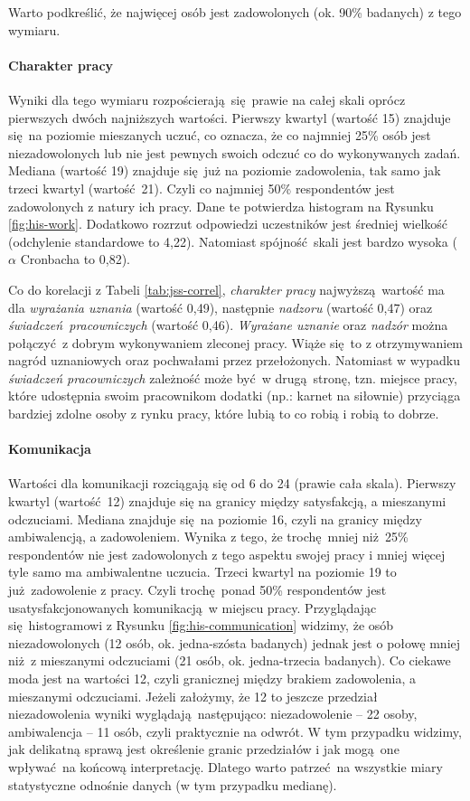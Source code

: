 Warto podkreślić, że najwięcej osób jest zadowolonych (ok. 90\% badanych) z tego wymiaru.

\paragraph{Charakter pracy} Wyniki dla tego wymiaru rozpościerają się prawie na całej skali oprócz pierwszych dwóch najniższych wartości. Pierwszy kwartyl (wartość 15) znajduje się na poziomie mieszanych uczuć, co oznacza, że co najmniej 25\% osób jest niezadowolonych lub nie jest pewnych swoich odczuć co do wykonywanych zadań. Mediana (wartość 19) znajduje się już na poziomie zadowolenia, tak samo jak trzeci kwartyl (wartość 21). Czyli co najmniej 50\% respondentów jest zadowolonych z
natury ich pracy. Dane te potwierdza histogram na Rysunku \ref{fig:his-work}. Dodatkowo rozrzut odpowiedzi uczestników jest średniej wielkość (odchylenie standardowe to 4,22). Natomiast spójność skali jest bardzo wysoka ($\alpha$ Cronbacha to 0,82).

Co do korelacji z Tabeli \ref{tab:jss-correl}, \textit{charakter pracy} najwyższą wartość ma dla \textit{wyrażania uznania} (wartość 0,49), następnie \textit{nadzoru} (wartość 0,47) oraz \textit{świadczeń pracowniczych} (wartość 0,46). \textit{Wyrażane uznanie} oraz \textit{nadzór} można połączyć z dobrym wykonywaniem zleconej pracy. Wiąże się to z otrzymywaniem nagród uznaniowych oraz pochwałami przez przełożonych. Natomiast w wypadku \textit{świadczeń pracowniczych} zależność może być w drugą stronę, tzn. miejsce pracy, które udostępnia swoim
pracownikom dodatki (np.: karnet na siłownie) przyciąga bardziej zdolne osoby z rynku pracy, które lubią to co robią i robią to dobrze.

\paragraph{Komunikacja} Wartości dla komunikacji rozciągają się od 6 do 24 (prawie cała skala). Pierwszy kwartyl (wartość 12) znajduje się na granicy między satysfakcją, a mieszanymi odczuciami. Mediana znajduje się na poziomie 16, czyli na granicy między ambiwalencją, a zadowoleniem. Wynika z tego, że trochę mniej niż 25\% respondentów nie jest zadowolonych z tego aspektu swojej pracy i mniej więcej tyle samo ma ambiwalentne uczucia. Trzeci kwartyl na poziomie 19 to
już zadowolenie z pracy. Czyli trochę ponad 50\% respondentów jest usatysfakcjonowanych komunikacją w miejscu pracy. Przyglądając się histogramowi z Rysunku \ref{fig:his-communication} widzimy, że osób niezadowolonych (12 osób, ok. jedna-szósta badanych) jednak jest o połowę mniej niż z mieszanymi odczuciami (21 osób, ok. jedna-trzecia badanych). Co ciekawe moda jest na wartości 12, czyli granicznej między brakiem zadowolenia, a mieszanymi odczuciami. Jeżeli założymy, że 12 to jeszcze przedział
niezadowolenia wyniki wyglądają następująco: niezadowolenie -- 22 osoby, ambiwalencja -- 11 osób, czyli praktycznie na odwrót. W tym przypadku widzimy, jak delikatną sprawą jest określenie granic przedziałów i jak mogą one wpływać na końcową interpretację. Dlatego warto patrzeć na wszystkie miary statystyczne odnośnie danych (w tym przypadku medianę). 

